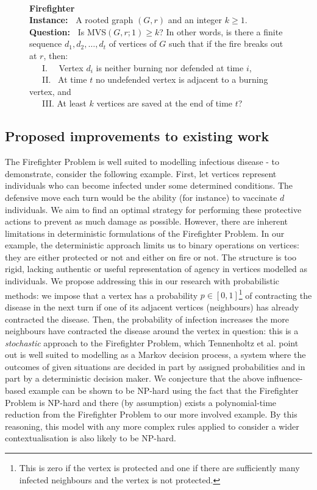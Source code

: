 \documentclass[hidelinks,a4paper,11pt]{article}
\numberwithin{equation}{section}
\begin{document}
\begin{figure}[ht]
\label{fig:detfire}
\textbf{\\ \large\sc Firefighter}\\
\textbf{\large\sc Instance:~} A rooted graph $(G, r)$ and an integer $k \geq 1$.\\
\textbf{\large\sc Question:~} Is MVS$(G, r; 1) \geq k$? In other words, is there a finite sequence $d_1, d_2, \dots,d_t$ of vertices of $G$ such that if the fire breaks out at $r$, then:\\
~~~I. ~~Vertex $d_i$ is neither burning nor defended at time $i$,\\
~~~II. ~At time $t$ no undefended vertex is adjacent to a burning vertex, and\\
~~~III. At least $k$ vertices are saved at the end of time $t$? \cite{finbow09}
\end{figure}


\subsection{Proposed improvements to existing work}

The Firefighter Problem is well suited to modelling infectious disease - to demonstrate, consider the following example. First, let vertices represent individuals who can become infected under some determined conditions. The defensive move each turn would be the ability (for instance) to vaccinate $d$ individuals. We aim to find an optimal strategy for performing these protective actions to prevent as much damage as possible. However, there are inherent limitations in deterministic formulations of the Firefighter Problem. In our example, the deterministic approach limits us to binary operations on vertices: they are either protected or not and either on fire or not. The structure is too rigid, lacking authentic or useful representation of agency in vertices modelled as individuals. We propose addressing this in our research with probabilistic methods: we impose that a vertex has a probability $p\in[0,1]$\footnote{This is zero if the vertex is protected and one if there are sufficiently many infected neighbours and the vertex is not protected.} of contracting the disease in the next turn if one of its adjacent vertices (neighbours) has already contracted the disease. Then, the probability of infection increases the more neighbours have contracted the disease around the vertex in question: this is a {\it stochastic} approach to the Firefighter Problem, which Tennenholtz et al. point out is well suited to modelling as a Markov decision process, \cite{tennenholtz17} a system where the outcomes of given situations are decided in part by assigned probabilities and in part by a deterministic decision maker. We conjecture that the above influence-based example can be shown to be NP-hard using the fact that the Firefighter Problem is NP-hard and there (by assumption) exists a polynomial-time reduction from the Firefighter Problem to our more involved example. By this reasoning, this model with any more complex rules applied to consider a wider contextualisation is also likely to be NP-hard.\\
\end{document}
